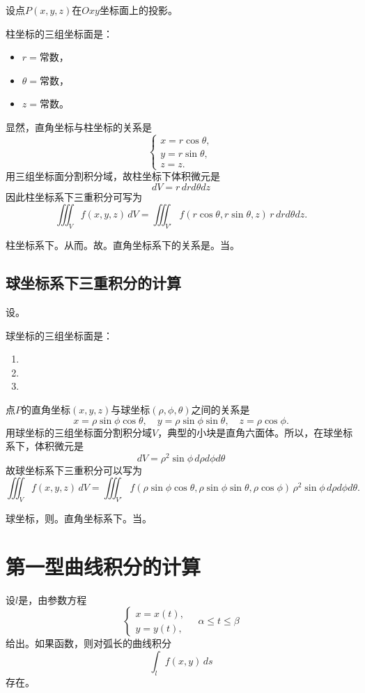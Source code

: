 设点$P(x,y,z)$在$Oxy$坐标面上的投影。

柱坐标的三组坐标面是：
\begin{itemize}
    \item $r=$常数，
    \item $\theta=$常数，
    \item $z=$常数。
\end{itemize}

显然，直角坐标与柱坐标的关系是
\[
\begin{cases}
x=r\cos\theta,\\
y=r\sin\theta,\\
z=z.
\end{cases}
\]
用三组坐标面分割积分域，故柱坐标下体积微元是
\[
dV=r\,dr d\theta dz
\]
因此柱坐标系下三重积分可写为
\[
\iiint_V f(x,y,z)\,dV
=\iiint_{V'} f(r\cos\theta,r\sin\theta,z)\,r\,dr d\theta dz.
\]

柱坐标系下。从而。故。直角坐标系下的关系是。当。

\subsection{球坐标系下三重积分的计算}

设。

球坐标的三组坐标面是：
\begin{enumerate}
    \item
    \item
    \item
\end{enumerate}

点$P$的直角坐标$(x,y,z)$与球坐标$(\rho,\phi,\theta)$之间的关系是
\[
x=\rho\sin{\phi}\cos{\theta},\quad
y=\rho\sin{\phi}\sin{\theta},\quad
z=\rho\cos{\phi}.
\]
用球坐标的三组坐标面分割积分域$V$，典型的小块是直角六面体。所以，在球坐标系下，体积微元是
\[
dV=\rho^2\sin{\phi}\,d\rho d\phi d\theta
\]
故球坐标系下三重积分可以写为
\[
\iiint_V f(x,y,z)\,dV
=\iiint_{V'} f(\rho\sin\phi\cos\theta,\rho\sin\phi\sin\theta,\rho\cos\phi)\,\rho^2\sin\phi\,d\rho d\phi d\theta.
\]

球坐标，则。直角坐标系下。当。

\section{第一型曲线积分的计算}

设$l$是，由参数方程
\[
\begin{cases}
x=x(t),\\
y=y(t),
\end{cases}\quad \alpha\le t\le\beta
\]
给出。如果函数，则对弧长的曲线积分
\[
\int_l f(x,y)\,ds
\]
存在。

